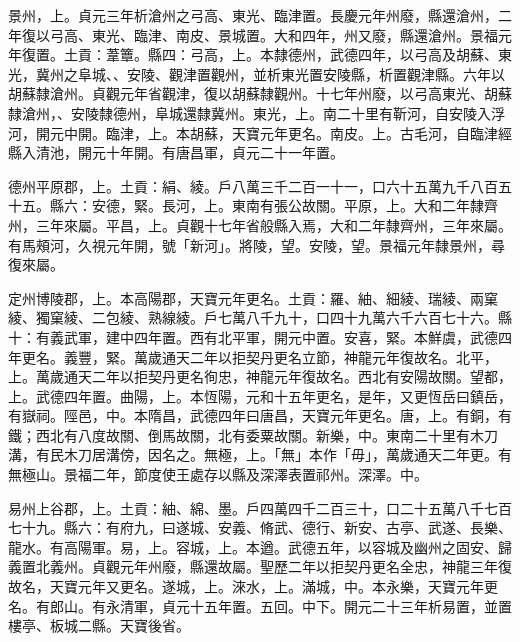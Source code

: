 \begin{pinyinscope}
 景州，上。貞元三年析滄州之弓高、東光、臨津置。長慶元年州廢，縣還滄州，二年復以弓高、東光、臨津、南皮、景城置。大和四年，州又廢，縣還滄州。景福元年復置。土貢：葦簟。縣四：弓高，上。本隸德州，武德四年，以弓高及胡蘇、東光，冀州之阜城、、安陵、觀津置觀州，並析東光置安陵縣，析置觀津縣。六年以胡蘇隸滄州。貞觀元年省觀津，復以胡蘇隸觀州。十七年州廢，以弓高東光、胡蘇隸滄州，、安陵隸德州，阜城還隸冀州。東光，上。南二十里有靳河，自安陵入浮河，開元中開。臨津，上。本胡蘇，天寶元年更名。南皮。上。古毛河，自臨津經縣入清池，開元十年開。有唐昌軍，貞元二十一年置。



 德州平原郡，上。土貢：絹、綾。戶八萬三千二百一十一，口六十五萬九千八百五十五。縣六：安德，緊。長河，上。東南有張公故關。平原，上。大和二年隸齊州，三年來屬。平昌，上。貞觀十七年省般縣入焉，大和二年隸齊州，三年來屬。有馬頰河，久視元年開，號「新河」。將陵，望。安陵，望。景福元年隸景州，尋復來屬。



 定州博陵郡，上。本高陽郡，天寶元年更名。土貢：羅、紬、細綾、瑞綾、兩窠綾、獨窠綾、二包綾、熟線綾。戶七萬八千九十，口四十九萬六千六百七十六。縣十：有義武軍，建中四年置。西有北平軍，開元中置。安喜，緊。本鮮虞，武德四年更名。義豐，緊。萬歲通天二年以拒契丹更名立節，神龍元年復故名。北平，上。萬歲通天二年以拒契丹更名徇忠，神龍元年復故名。西北有安陽故關。望都，上。武德四年置。曲陽，上。本恆陽，元和十五年更名，是年，又更恆岳曰鎮岳，有嶽祠。陘邑，中。本隋昌，武德四年曰唐昌，天寶元年更名。唐，上。有銅，有鐵；西北有八度故關、倒馬故關，北有委粟故關。新樂，中。東南二十里有木刀溝，有民木刀居溝傍，因名之。無極，上。「無」本作「毋」，萬歲通天二年更。有無極山。景福二年，節度使王處存以縣及深澤表置祁州。深澤。中。



 易州上谷郡，上。土貢：紬、綿、墨。戶四萬四千二百三十，口二十五萬八千七百七十九。縣六：有府九，曰遂城、安義、脩武、德行、新安、古亭、武遂、長樂、龍水。有高陽軍。易，上。容城，上。本遒。武德五年，以容城及幽州之固安、歸義置北義州。貞觀元年州廢，縣還故屬。聖歷二年以拒契丹更名全忠，神龍三年復故名，天寶元年又更名。遂城，上。淶水，上。滿城，中。本永樂，天寶元年更名。有郎山。有永清軍，貞元十五年置。五回。中下。開元二十三年析易置，並置樓亭、板城二縣。天寶後省。




\end{pinyinscope}
